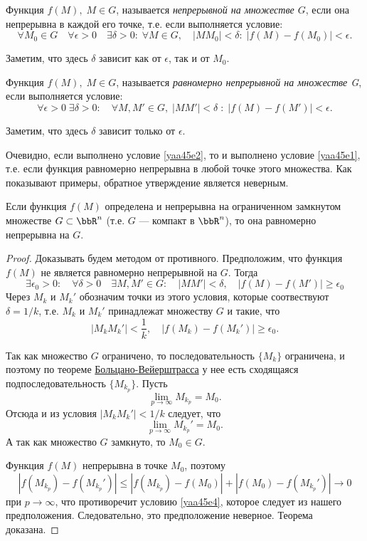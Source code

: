 \begin{defn}
Функция $f(M),\;M\in G$, называется \textit{непрерывной на множестве $G$}, если она непрерывна в каждой его точке, т.е. если выполняется условие:
\begin{equation}\label{yaa45e1}
\forall M_0\in G\quad \forall\epsilon>0 \quad \exists\delta>0:\;\forall M\in G,\quad |MM_0|<\delta:\;|f(M)-f(M_0)|<\epsilon.
\end{equation}
\end{defn}
Заметим, что здесь $\delta$ зависит как от $\epsilon$, так и от $M_0$.

\begin{defn}
Функция $f(M),\; M\in G$, называется \textit{равномерно непрерывной на множестве G}, если выполняется условие:
\begin{equation}\label{yaa45e2}
\forall\epsilon>0\;\exists\delta>0:\quad\forall M, M'\in G,\; |MM'|<\delta\; :\; |f(M)-f(M')|<\epsilon.
\end{equation}
\end{defn}
Заметим, что здесь $\delta$ зависит только от $\epsilon$.

Очевидно, если выполнено условие \eqref{yaa45e2}, то и выполнено условие \eqref{yaa45e1}, т.е. если функция равномерно непрерывна в любой точке этого множества. Как показывают примеры, обратное утверждение является неверным.

\begin{thm}
Если функция $f(M)$ определена и непрерывна на ограниченном замкнутом множестве $G\subset\bbR^n$ (т.е. $G$ --- компакт в $\bbR^n$), то она равномерно непрерывна на $G$.
\end{thm}

\begin{proof}
Доказывать будем методом от противного. Предположим, что функция $f(M)$ не является равномерно непрерывной на $G$. Тогда
$$
\exists\epsilon_0>0:\quad\forall\delta>0\quad\exists M,M'\in G:\quad |MM'|<\delta, \quad |f(M)-f(M')|\ge \epsilon_0
$$
Через $M_k$ и $M_k'$ обозначим точки из этого условия, которые соотвествуют $\delta=1/k$, т.е. $M_k$ и $M_k'$ принадлежат множеству $G$ и такие, что 
\begin{equation}\label{yaa45e4}
|M_kM_k'|<\frac{1}{k},\quad|f(M_k)-f(M_k')|\ge \epsilon_0.
\end{equation}

Так как множество $G$ ограничено, то последовательность $\{M_k\}$ ограничена, и поэтому по теореме \hyperref[ch1.1thm3]{Больцано-Вейерштрасса} у нее есть сходящаяся подпоследовательность $\{M_{k_p}\}$. Пусть
$$
\lim\limits_{p\to\infty} M_{k_p} =M_0.
$$
Отсюда и из условия $|M_kM_k'|<1/k$ следует, что 
$$
\lim\limits_{p\to\infty} M_{k_p}' =M_0.
$$
А так как множество $G$ замкнуто, то $M_0 \in G$.

Функция $f(M)$ непрерывна в точке $M_0$, поэтому
$$
|f(M_{k_p})-f(M_{k_p}')|\le |f(M_{k_p})-f(M_0)|+|f(M_0)-f(M_{k_p}')|\to 0
$$
при $p\to\infty$, что противоречит условию \eqref{yaa45e4}, которое следует из нашего предположения. Следовательно, это предположение неверное. Теорема доказана.
\end{proof}

